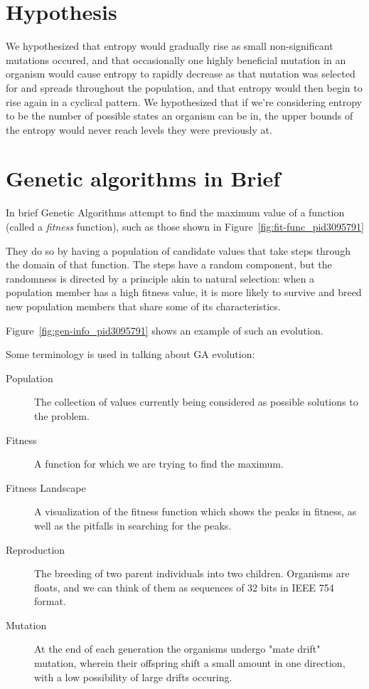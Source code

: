 \documentclass[11pt]{article}
\begin{document}
\section{Hypothesis}
\label{sec:org26a3be1}
We hypothesized that entropy would gradually rise as small non-significant
mutations occured, and that occasionally one highly beneficial mutation in
an organism would cause entropy to rapidly decrease as that mutation was
selected for and spreads throughout the population, and that entropy would then
begin to rise again in a cyclical pattern. We hypothesized that if we're considering
entropy to be the number of possible states an organism can be in, the
upper bounds of the entropy would never reach levels they were previously at.


\section{Genetic algorithms in Brief}

In brief Genetic Algorithms attempt to find the maximum value of a
function (called a \emph{fitness} function), such as those shown in
Figure~\ref{fig:fit-func_pid3095791}

They do so by having a population of candidate values that take steps
through the domain of that function.  The steps have a random
component, but the randomness is directed by a principle akin to
natural selection: when a population member has a high fitness value,
it is more likely to survive and breed new population members that
share some of its characteristics.

Figure~\ref{fig:gen-info_pid3095791} shows an example of such an
evolution.

Some terminology is used in talking about GA evolution:

\begin{description}
\item[Population] The collection of values currently being considered
  as possible solutions to the problem.
\item[Fitness] A function for which we are trying to find the maximum.
\item[Fitness Landscape] A visualization of the fitness function which
  shows the peaks in fitness, as well as the pitfalls in searching for
  the peaks.
\item[Reproduction] The breeding of two parent individuals into two children. Organisms are
floats, and we can think of them as sequences of 32 bits in IEEE 754 format.
\item[Mutation] At the end of each generation the organisms undergo "mate drift" mutation, 
wherein their offspring shift a small amount in one direction, with a low possibility 
of large drifts occuring.
\end{description}
\end{document}
